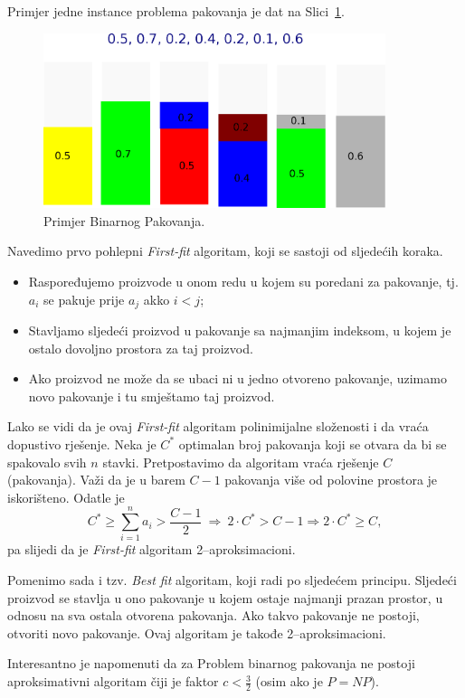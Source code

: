 \documentclass[a4paper, utf8, 11pt, colorlinks]{book}
\theoremstyle{definition}
\begin{document}
  Primjer jedne instance problema pakovanja je dat na Slici~\ref{fig:bin-packing}.
 

\begin{figure}[H] 
	\centering
	\includegraphics[width=100mm]{maxresdefault.eps}%
	\caption{Primjer Binarnog Pakovanja.}
    \label{fig:bin-packing}
\end{figure}

Navedimo prvo pohlepni \emph{First-fit} algoritam, koji se sastoji od sljedećih koraka.
\begin{itemize}
	\item Raspoređujemo proizvode u onom redu u kojem su poredani za pakovanje, tj. $a_i$ se pakuje prije $a_j$ akko $i < j$;
	\item Stavljamo sljedeći proizvod u pakovanje sa najmanjim indeksom, u kojem je ostalo dovoljno prostora za taj proizvod.
	 \item Ako proizvod ne može da se ubaci ni u jedno otvoreno pakovanje, uzimamo novo pakovanje i tu smještamo taj proizvod.
\end{itemize}


Lako se vidi da je ovaj  \emph{First-fit} algoritam polinimijalne složenosti i da vraća dopustivo rješenje.  Neka je $C^*$ optimalan broj pakovanja koji se otvara da bi se spakovalo svih $n$ stavki. Pretpostavimo da algoritam vraća rješenje $C$ (pakovanja). Važi da je u barem $C-1$ pakovanja više od polovine prostora je iskorišteno. Odatle je
$$C^* \geq \sum_{i=1}^n a_i > \frac{C-1}{2}\ \Rightarrow\  2 \cdot C^* > C-1 \Rightarrow 2 \cdot C^* \geq C,$$
pa slijedi da je \emph{First-fit}  algoritam 2--aproksimacioni. 

Pomenimo sada i tzv. \emph{Best fit} algoritam, koji radi po sljedećem principu. Sljedeći proizvod se stavlja u ono pakovanje u kojem  ostaje najmanji prazan prostor, u odnosu na sva ostala otvorena pakovanja. Ako takvo pakovanje ne postoji, otvoriti novo pakovanje. 
Ovaj algoritam je takođe 2--aproksimacioni. 

Interesantno je napomenuti da za Problem binarnog pakovanja ne postoji aproksimativni algoritam čiji je faktor $c <\frac{3}{2}$ (osim ako je $P=NP$). 
\end{document}
